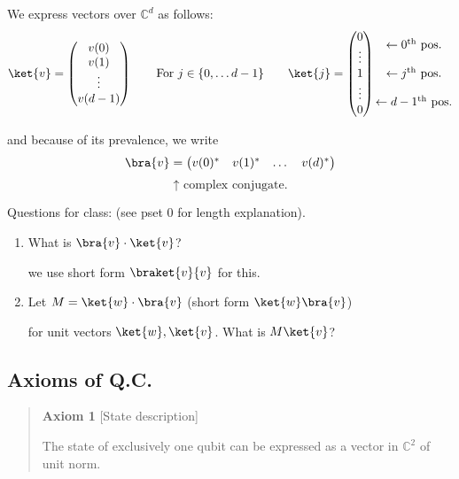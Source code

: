 \documentclass[11pt]{article}
\begin{document}
We express vectors over $\mathbb{C}^d$ as follows:
\[
\ket{v} = \begin{pmatrix} v(0) \\ v(1) \\ \vdots \\ v(d-1) \end{pmatrix}
\qquad
\text{For } j \in \{0, \dots d-1\}
\qquad
\ket{j} = \begin{pmatrix} 0 \\ \vdots \\ 1 \\ \vdots \\ 0 \end{pmatrix}
\begin{matrix} \leftarrow 0^{\text{th}} \text{ pos.} \\ \\ \leftarrow j^{\text{th}} \text{ pos.} \\ \\ \leftarrow d-1^{\text{th}} \text{ pos.} \end{matrix}
\]

and because of its prevalence, we write
\[
\bra{v} = \begin{pmatrix} v(0)^* & v(1)^* & \dots & v(d)^* \end{pmatrix}
\]
\[
\uparrow \text{ complex conjugate.}
\]

Questions for class: (see pset 0 for length explanation).

\begin{enumerate}
    \item[\textcircled{1}] What is $\bra{v} \cdot \ket{v}$?

    we use short form $\braket{v}{v}$ for this.

    \item[\textcircled{2}] Let $M = \ket{w} \cdot \bra{v}$ (short form $\ket{w}\bra{v}$)

    for unit vectors $\ket{w}, \ket{v}$. What is $M\ket{v}$?
\end{enumerate}

\subsection*{Axioms of Q.C.}

\begin{quote}
\textbf{Axiom 1} [State description]

The state of exclusively one qubit can be expressed as a vector in $\mathbb{C}^2$ of unit norm.
\end{quote}
\end{document}
